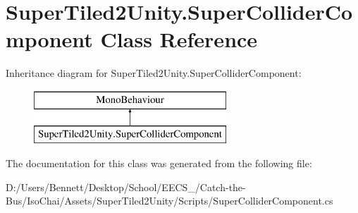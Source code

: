 \hypertarget{class_super_tiled2_unity_1_1_super_collider_component}{}\section{Super\+Tiled2\+Unity.\+Super\+Collider\+Component Class Reference}
\label{class_super_tiled2_unity_1_1_super_collider_component}
Inheritance diagram for Super\+Tiled2\+Unity.\+Super\+Collider\+Component\+:\begin{figure}[H]
\begin{center}
\leavevmode
\includegraphics[height=2.000000cm]{class_super_tiled2_unity_1_1_super_collider_component}
\end{center}
\end{figure}


The documentation for this class was generated from the following file\+:\begin{DoxyCompactItemize}
\item 
D\+:/\+Users/\+Bennett/\+Desktop/\+School/\+E\+E\+C\+S\+\_/\+Catch-\/the-\/\+Bus/\+Iso\+Chai/\+Assets/\+Super\+Tiled2\+Unity/\+Scripts/Super\+Collider\+Component.\+cs\end{DoxyCompactItemize}
